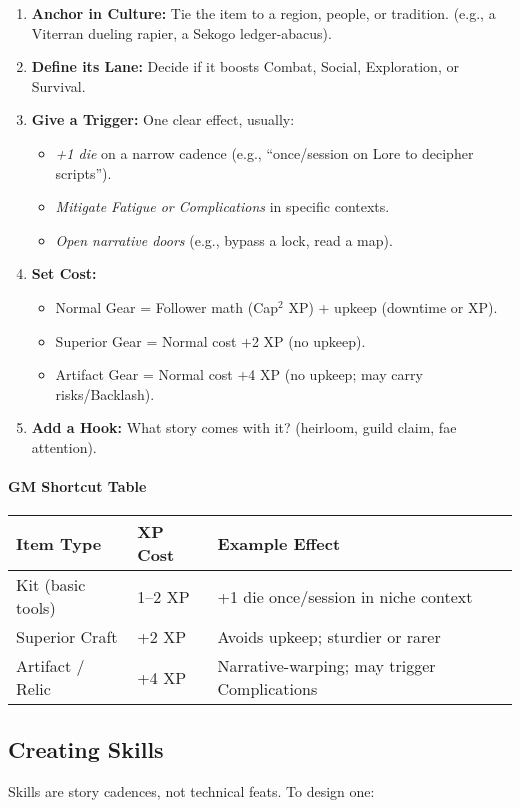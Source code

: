 \documentclass[12pt]{article}
\begin{document}
\begin{enumerate}
  \item \textbf{Anchor in Culture:} Tie the item to a region, people, or tradition. (e.g., a Viterran dueling rapier, a Sekogo ledger-abacus).
  \item \textbf{Define its Lane:} Decide if it boosts Combat, Social, Exploration, or Survival.
  \item \textbf{Give a Trigger:} One clear effect, usually:
    \begin{itemize}
      \item \emph{+1 die} on a narrow cadence (e.g., “once/session on Lore to decipher scripts”).
      \item \emph{Mitigate Fatigue or Complications} in specific contexts.
      \item \emph{Open narrative doors} (e.g., bypass a lock, read a map).
    \end{itemize}
  \item \textbf{Set Cost:}
    \begin{itemize}
      \item Normal Gear = Follower math (Cap$^2$ XP) + upkeep (downtime or XP).
      \item Superior Gear = Normal cost +2 XP (no upkeep).
      \item Artifact Gear = Normal cost +4 XP (no upkeep; may carry risks/Backlash).
    \end{itemize}
  \item \textbf{Add a Hook:} What story comes with it? (heirloom, guild claim, fae attention).
\end{enumerate}

\paragraph{GM Shortcut Table}
\begin{tabular}{@{}lll@{}}
\toprule
\textbf{Item Type} & \textbf{XP Cost} & \textbf{Example Effect} \\
\midrule
Kit (basic tools) & 1--2 XP & +1 die once/session in niche context \\
Superior Craft & +2 XP & Avoids upkeep; sturdier or rarer \\
Artifact / Relic & +4 XP & Narrative-warping; may trigger Complications \\
\bottomrule
\end{tabular}

\subsection*{Creating Skills}
Skills are story cadences, not technical feats.  
To design one:
\end{document}
